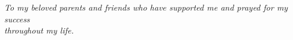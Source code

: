 \newpage
\begin{dedication}
\textit{To my beloved parents and friends who have supported me and prayed for my success\\ throughout my life.}
\end{dedication}
